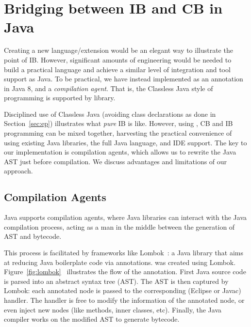 \section{Bridging between IB and CB in Java}\label{sec:imp}


Creating a new language/extension would be an
elegant way to illustrate the point of IB. However,
significant amounts of engineering would be needed to build a practical
language and achieve a similar level of integration and tool support
as Java. To be practical, %
we have instead implemented
\mixin as an annotation in Java 8, and a \emph{compilation agent}.
That is, the Classless Java style of programming
is supported by library.

Disciplined use of Classless Java (avoiding class
declarations as done in Section~\ref{sec:ep}) illustrates what \emph{pure} IB is like.
However, using \mixin, CB and IB programming can be mixed together,
harvesting the practical convenience of using existing Java libraries, the full
Java language, and IDE support.
The key to our implementation is compilation agents, which
 allows us to rewrite the Java AST just
before compilation. We discuss advantages and limitations of our approach.

\subsection{Compilation Agents}
Java supports compilation agents, where Java libraries can interact with the Java compilation process,
acting as a man in the middle between the
generation of AST and bytecode.

This process is facilitated by frameworks like Lombok~\cite{lombok}:
a Java library that aims at reducing Java boilerplate code via 
annotations. \mixin was created using Lombok.
Figure~\ref{fig:lombok}~\cite{neildo2011blog} illustrates the flow of
the \mixin annotation.
First Java source code is parsed into an abstract syntax tree (AST).
The AST is then captured by Lombok:
each annotated node is passed to
the corresponding (Eclipse or Javac) handler. The handler is
free to modify the information of the annotated node, or even inject new nodes (like methods, inner classes,
etc). Finally, the Java compiler works on the modified AST to generate bytecode.


